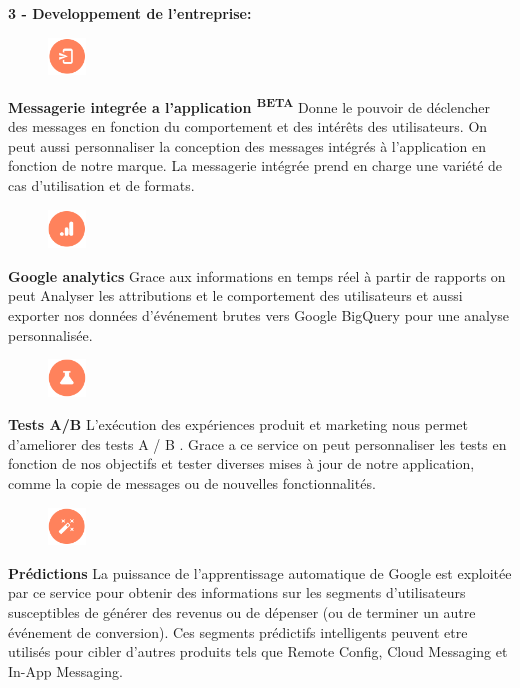 \tab \textbf{3 - Developpement de l'entreprise:}\bigskip


\begin{figure}
    \includegraphics[width=1cm]{images/Chapitre2/Firebase_services/in-app_messaging.PNG}
        \end{figure}
\textbf{Messagerie integrée a l'application \textsuperscript{BETA}} Donne le pouvoir de déclencher 
des messages en fonction du comportement et des intérêts des utilisateurs. On peut aussi personnaliser
la conception des messages intégrés à l'application en fonction de notre marque. La messagerie 
intégrée prend en charge une variété de cas d'utilisation et de formats. \medskip 

\begin{figure}
    \includegraphics[width=1cm]{images/Chapitre2/Firebase_services/google_analytics.PNG}
        \end{figure}
\textbf{Google analytics} Grace aux informations en temps réel à partir de rapports on peut
Analyser les attributions et le comportement des utilisateurs et aussi exporter nos données
d'événement brutes vers Google BigQuery pour une analyse personnalisée. \medskip 

\begin{figure}
    \includegraphics[width=1cm]{images/Chapitre2/Firebase_services/a_b_testing.PNG}
        \end{figure}
\textbf{Tests A/B} L'exécution des expériences produit et marketing nous permet d'ameliorer
des tests A / B . Grace a ce service on peut personnaliser les tests en fonction de nos
objectifs et tester diverses mises à jour de notre application, comme la copie de messages
ou de nouvelles fonctionnalités. \medskip 

\begin{figure}
    \includegraphics[width=1cm]{images/Chapitre2/Firebase_services/predictions.PNG}
        \end{figure}
\textbf{Prédictions} La puissance de l'apprentissage automatique de Google est exploitée
par ce service pour obtenir des informations sur les segments d'utilisateurs susceptibles
de générer des revenus ou de dépenser (ou de terminer un autre événement de conversion).
Ces segments prédictifs intelligents peuvent etre utilisés pour cibler d'autres produits
tels que Remote Config, Cloud Messaging et In-App Messaging.\medskip 

